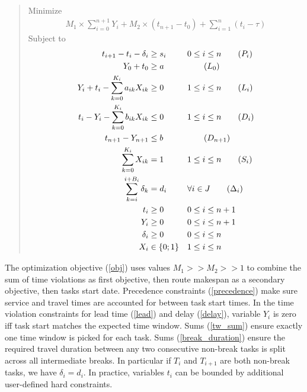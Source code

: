 \documentclass{article}
\begin{document}
\begin{quote}
  Minimize
  \begin{align}
    M_1 \times \sum_{i = 0}^{n + 1} Y_i + M_2 \times (t_{n +1} - t_0) + \sum_{i = 1}^{n}(t_i - \tau) \label{obj}\tag{Obj}
  \end{align}
  Subject to
  \begin{align}
    t_{i + 1} - t_i - \delta_i &\geq s_i && 0 \leq i \leq n\label{precedence}\tag{$P_i$}\\
    Y_0 + t_0 &\geq a &&  \label{lead_start}\tag{$L_0$}\\
    Y_i + t_i - \sum_{k = 0}^{K_i}a_{ik}X_{ik}&\geq 0 && 1 \leq i \leq n \label{lead}\tag{$L_i$}\\
    t_i - Y_i - \sum_{k = 0}^{K_i}b_{ik}X_{ik} &\leq 0 && 1 \leq i \leq n \label{delay}\tag{$D_i$}\\
    t_{n + 1} - Y_{n + 1} &\leq b && \label{delay_end}\tag{$D_{n + 1}$}\\
    \sum_{k = 0}^{K_i}X_{ik} &= 1 && 1 \leq i \leq n \label{tw_sum}\tag{$S_i$}\\
    \sum_{k = i}^{i + B_i}\delta_k &= d_i && \forall i\in J \label{break_duration}\tag{$\Delta_i$}\\
    t_i &\geq 0 && 0 \leq i \leq n + 1 \nonumber\\
    Y_i &\geq 0 && 0 \leq i \leq n + 1 \nonumber\\
    \delta_i &\geq 0 && 0 \leq i \leq n \nonumber\\
    X_i &\in \{0; 1\} && 1 \leq i \leq n \nonumber
  \end{align}
\end{quote}

The optimization objective (\ref{obj}) uses values $M_1 >> M_2 >> 1$
to combine the sum of time violations as first objective, then route
makespan as a secondary objective, then tasks start date. Precedence
constraints (\ref{precedence}) make sure service and travel times are
accounted for between task start times. In the time violation
constraints for lead time (\ref{lead}) and delay (\ref{delay}),
variable $Y_i$ is zero iff task start matches the expected time
window. Sums (\ref{tw_sum}) ensure exactly one time window is picked
for each task. Sums (\ref{break_duration}) ensure the required travel
duration between any two consecutive non-break tasks is split across
all intermediate breaks. In particular if $T_i$ and $T_{i + 1}$ are
both non-break tasks, we have $\delta_i = d_i$. In practice, variables
$t_i$ can be bounded by additional user-defined hard constraints.
\end{document}
